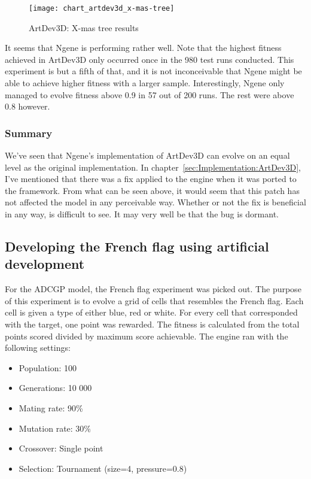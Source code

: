 \begin{figure}[!ht]
	\centering
	\texttt{[image: chart\_artdev3d\_x-mas-tree]}
	\caption{ArtDev3D: X-mas tree results}
	\label{fig:chart_artdev3d_x-mas-tree}
\end{figure}

It seems that Ngene is performing rather well. Note that the highest fitness achieved in ArtDev3D only occurred once in the 980 test runs conducted. This experiment is but a fifth of that, and it is not inconceivable that Ngene might be able to achieve higher fitness with a larger sample. Interestingly, Ngene only managed to evolve fitness above 0.9 in 57 out of 200 runs. The rest were above 0.8 however.

\subsubsection{Summary}
We've seen that Ngene's implementation of ArtDev3D can evolve on an equal level as the original implementation. In chapter~\ref{sec:Implementation:ArtDev3D}, I've mentioned that there was a fix applied to the engine when it was ported to the framework. From what can be seen above, it would seem that this patch has not affected the model in any perceivable way. Whether or not the fix is beneficial in any way, is difficult to see. It may very well be that the bug is dormant.


\subsection{Developing the French flag using artificial development}
For the ADCGP model, the French flag experiment was picked out. The purpose of this experiment is to evolve a grid of cells that resembles the French flag. Each cell is given a type of either blue, red or white. For every cell that corresponded with the target, one point was rewarded. The fitness is calculated from the total points scored divided by maximum score achievable. The engine ran with the following settings:

\begin{itemize}
	\itemsep=-2pt
	\item Population: 100
	\item Generations: 10 000
	\item Mating rate: 90\%
	\item Mutation rate: 30\%
	\item Crossover: Single point
	\item Selection: Tournament (size=4, pressure=0.8)
\end{itemize}

